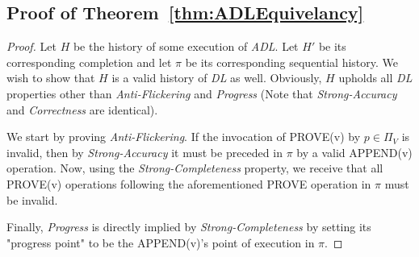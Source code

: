 \documentclass[11pt]{article}
\theoremstyle{definition}
\begin{document}
\subsection{Proof of Theorem~\ref{thm:ADLEquivelancy}}
\begin{proof}\label{prf:ADLEquivelancy}
Let $H$ be the history of some execution of \textit{ADL}. Let $H'$ be its corresponding completion and let $\pi$ be its corresponding sequential history. We wish to show that $H$ is a valid history of \textit{DL} as well. Obviously, $H$ upholds all \textit{DL} properties other than \textit{Anti-Flickering} and \textit{Progress} (Note that \textit{Strong-Accuracy} and \textit{Correctness} are identical). 

We start by proving \textit{Anti-Flickering}.  If the invocation of PROVE(v) by $p\in\Pi_V$ is invalid, then by \textit{Strong-Accuracy} it must be preceded in $\pi$ by a valid APPEND(v) operation. Now, using the \textit{Strong-Completeness} property, we receive that all PROVE(v) operations following the aforementioned PROVE operation in $\pi$ must be invalid.

Finally, \textit{Progress} is directly implied by \textit{Strong-Completeness} by setting its "progress point" to be the APPEND(v)'s point of execution in $\pi$. 
\end{proof}
\end{document}
